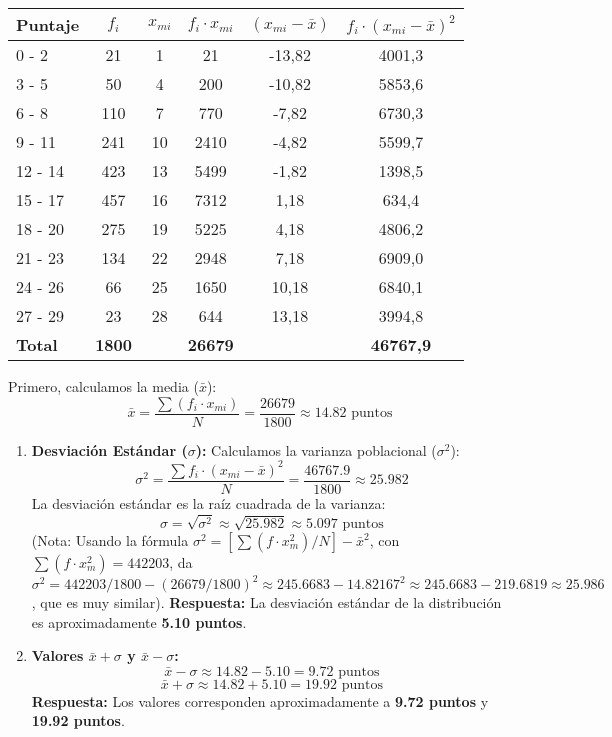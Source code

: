 \documentclass[12pt, a4paper]{article} %
\newcommand{\mean}[1]{\ensuremath{\bar{#1}}} %
\newcommand{\pstdev}{\ensuremath{\sigma}} %
\newcommand{\pvar}{\ensuremath{\sigma^2}} %
\begin{document}
\begin{tabular}{l S[table-format=4.0] S[table-format=2.0] S[table-format=5.0] S[table-format=-2.2] S[table-format=5.1]}
\toprule
Puntaje & {$f_i$} & {$x_{mi}$} & {$f_i \cdot x_{mi}$} & {$(x_{mi} - \mean{x})$} & {$f_i \cdot (x_{mi} - \mean{x})^2$} \\
 - 2   & 21      & 1  & 21     & -13,82 & 4001,3 \\
3 - 5   & 50      & 4  & 200    & -10,82 & 5853,6 \\
6 - 8   & 110     & 7  & 770    & -7,82  & 6730,3 \\
9 - 11  & 241     & 10 & 2410   & -4,82  & 5599,7 \\
12 - 14 & 423     & 13 & 5499   & -1,82  & 1398,5 \\
15 - 17 & 457     & 16 & 7312   & 1,18   & 634,4 \\
18 - 20 & 275     & 19 & 5225   & 4,18   & 4806,2 \\
21 - 23 & 134     & 22 & 2948   & 7,18   & 6909,0 \\
24 - 26 & 66      & 25 & 1650   & 10,18  & 6840,1 \\
27 - 29 & 23      & 28 & 644    & 13,18  & 3994,8 \\
\midrule
\textbf{Total} & \textbf{1800} &    & \textbf{26679} & & \textbf{46767,9} \\
\bottomrule
\end{tabular}


\vspace{1ex}
Primero, calculamos la media (\mean{x}):
\[ \mean{x} = \frac{\sum (f_i \cdot x_{mi})}{N} = \frac{\num{26679}}{\num{1800}} \approx \num{14,82} \text{ puntos} \]

\begin{enumerate}
    \item \textbf{Desviación Estándar (\pstdev):}
    Calculamos la varianza poblacional (\pvar):
    \[ \pvar = \frac{\sum f_i \cdot (x_{mi} - \mean{x})^2}{N} = \frac{\num{46767,9}}{\num{1800}} \approx \num{25,982} \]
    La desviación estándar es la raíz cuadrada de la varianza:
    \[ \pstdev = \sqrt{\pvar} \approx \sqrt{\num{25,982}} \approx \num{5,097} \text{ puntos} \]
    (Nota: Usando la fórmula $\pvar = [\sum(f \cdot x_m^2) / N] - \mean{x}^2$, con $\sum(f \cdot x_m^2) = \num{442203}$, da $\pvar = \num{442203}/1800 - (\num{26679}/1800)^2 \approx \num{245,6683} - \num{14,82167}^2 \approx \num{245,6683} - \num{219,6819} \approx \num{25,986}$, que es muy similar).
    \textbf{Respuesta:} La desviación estándar de la distribución es aproximadamente \textbf{\num{5,10} puntos}.

    \item \textbf{Valores $\mean{x} + \pstdev$ y $\mean{x} - \pstdev$:}
    \[ \mean{x} - \pstdev \approx \num{14,82} - \num{5,10} = \num{9,72} \text{ puntos} \]
    \[ \mean{x} + \pstdev \approx \num{14,82} + \num{5,10} = \num{19,92} \text{ puntos} \]
    \textbf{Respuesta:} Los valores corresponden aproximadamente a \textbf{\num{9,72} puntos} y \textbf{\num{19,92} puntos}.
\end{enumerate}
\end{document}
